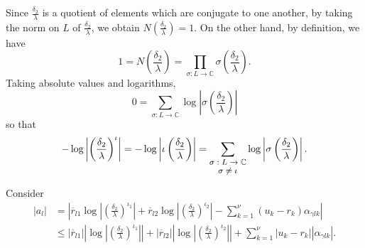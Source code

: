 Since $\frac{\delta_2}{\lambda}$ is a quotient of elements which are conjugate to one another, by taking the norm on $L$ of $\frac{\delta_2}{\lambda}$, we obtain $N\left(\frac{\delta_2}{\lambda}\right) = 1.$ On the other hand, by definition, we have 
\[1 = N\left(\frac{\delta_2}{\lambda}\right) = \prod_{\sigma: L \to \mathbb{C}} \sigma \left(\frac{\delta_2}{\lambda}\right).\]
Taking absolute values and logarithms, 
\[0 = \sum_{\sigma: L \to \mathbb{C}} \log\left|\sigma \left(\frac{\delta_2}{\lambda}\right)\right|\]
so that
\[-\log\left|\left(\frac{\delta_2}{\lambda}\right)^{\iota}\right| = -\log\left|\iota \left(\frac{\delta_2}{\lambda}\right)\right| = \sum_{\shortstack{\footnotesize $\sigma: L \to \mathbb{C} $\\ \footnotesize $ \sigma \neq \iota$}} \log\left|\sigma \left(\frac{\delta_2}{\lambda}\right)\right|.\]

Consider
\begin{align*}
|a_l| 	& = \left|\overline{r}_{l1}\log\left|\left(\frac{\delta_2}{\lambda}\right)^{\iota_1}\right| + \overline{r}_{l2}\log\left|\left(\frac{\delta_2}{\lambda}\right)^{\iota_2}\right| - \sum_{k=1}^{\nu}(u_k-r_k)\alpha_{\gamma l k}\right|\\
	& \leq |\overline{r}_{l1}|\left|\log\left|\left(\frac{\delta_2}{\lambda}\right)^{\iota_1}\right|\right| + |\overline{r}_{l2}|\left|\log\left|\left(\frac{\delta_2}{\lambda}\right)^{\iota_2}\right|\right| + \sum_{k=1}^{\nu}|u_k-r_k||\alpha_{\gamma l k}|.
\end{align*}

